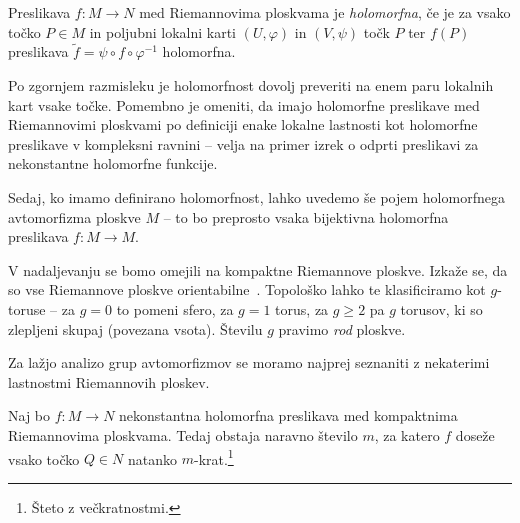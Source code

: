 \begin{definicija}
Preslikava $f \colon M \to N$ med Riemannovima ploskvama je
\emph{holomorfna}, če je za vsako točko $P \in M$ in poljubni
lokalni karti $(U, \varphi)$ in $(V, \psi)$ točk $P$ ter $f(P)$
preslikava $\tilde{f} = \psi \circ f \circ \varphi^{-1}$
holomorfna.
\end{definicija}

Po zgornjem razmisleku je holomorfnost dovolj preveriti na enem
paru lokalnih kart vsake točke. Pomembno je omeniti, da imajo
holomorfne preslikave med Riemannovimi ploskvami po definiciji
enake lokalne lastnosti kot holomorfne preslikave v kompleksni
ravnini -- velja na primer izrek o odprti preslikavi za
nekonstantne holomorfne funkcije.

Sedaj, ko imamo definirano holomorfnost, lahko uvedemo še pojem
holomorfnega avtomorfizma ploskve $M$ -- to bo preprosto vsaka
bijektivna holomorfna preslikava $f \colon M \to M$.

V nadaljevanju se bomo omejili na kompaktne Riemannove ploskve.
Izkaže se, da so vse Riemannove ploskve
orientabilne~\cite[razdelek 1.2.6]{Forstneric}. Topološko lahko te
klasificiramo kot $g$-toruse -- za $g=0$ to pomeni sfero, za $g=1$
torus, za $g \geq 2$ pa $g$ torusov, ki so zlepljeni skupaj
(povezana vsota). Številu $g$ pravimo \emph{rod} ploskve.



Za lažjo analizo grup avtomorfizmov se moramo najprej seznaniti z
nekaterimi lastnostmi Riemannovih ploskev.

\begin{trditev}
\label{td:deg}
Naj bo $f \colon M \to N$ nekonstantna holomorfna preslikava med
kompaktnima Riemannovima ploskvama. Tedaj obstaja naravno število
$m$, za katero $f$ doseže vsako točko $Q \in N$ natanko
$m$-krat.\footnote{Šteto z večkratnostmi.}
\end{trditev}

